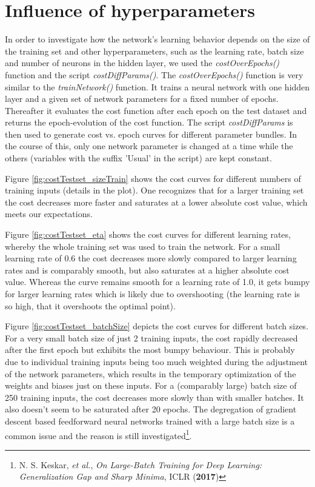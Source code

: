 
\section{Influence of hyperparameters}\label{params}

In order to investigate how the network's learning behavior depends on the size of the training set and other hyperparameters, such as the learning rate, batch size and number of neurons in the hidden layer, we used the \textit{costOverEpochs()} function and the script \textit{costDiffParams()}.
The \textit{costOverEpochs()} function is very similar to the \textit{trainNetwork()} function. It trains a neural network with one hidden layer and a given set of network parameters for
a fixed number of epochs. Thereafter it evaluates the cost function after each epoch on the test dataset and returns the epoch-evolution of the cost function. The script \textit{costDiffParams} is then used to generate cost vs. epoch curves for different parameter bundles. In the course of this, only one network parameter is changed at a time while the others (variables with the suffix 'Usual' in the script) are kept constant.

Figure \ref{fig:costTestset_sizeTrain} shows the cost curves for different numbers of training inputs (details in the plot). One recognizes that for a larger training set the cost decreases more faster and saturates at a lower absolute cost value, which meets our expectations.

Figure \ref{fig:costTestset_eta} shows the cost curves for different learning rates, whereby the whole training set was used to train the network. For a small learning rate of 0.6 the cost decreases more slowly compared to larger learning rates and is comparably smooth, but also saturates at a higher absolute cost value. Whereas the curve remains smooth for a learning rate of 1.0, it gets bumpy for larger learning rates which is likely due to overshooting (the learning rate is so high, that it overshoots the optimal point).

Figure \ref{fig:costTestset_batchSize} depicts the cost curves for different batch sizes. For a very small batch size of just 2 training inputs, the cost rapidly decreased after the first epoch but exhibits the most bumpy behaviour. This is probably due to individual training inputs being too much weighted during the adjustment of the network parameters, which results in the temporary optimization of the weights and biases just on these inputs. For a (comparably large) batch size of 250 training inputs, the cost decreases more slowly than with smaller batches. It also doesn't seem to be saturated after 20 epochs. The degregation of gradient descent based feedforward neural networks trained with a large batch size is a common issue and the reason is still investigated\footnote{N. S. Keskar, \textit{et al.}, \textit{On Large-Batch Training for Deep Learning: Generalization Gap and Sharp Minima}, ICLR (\textbf{2017})}.

